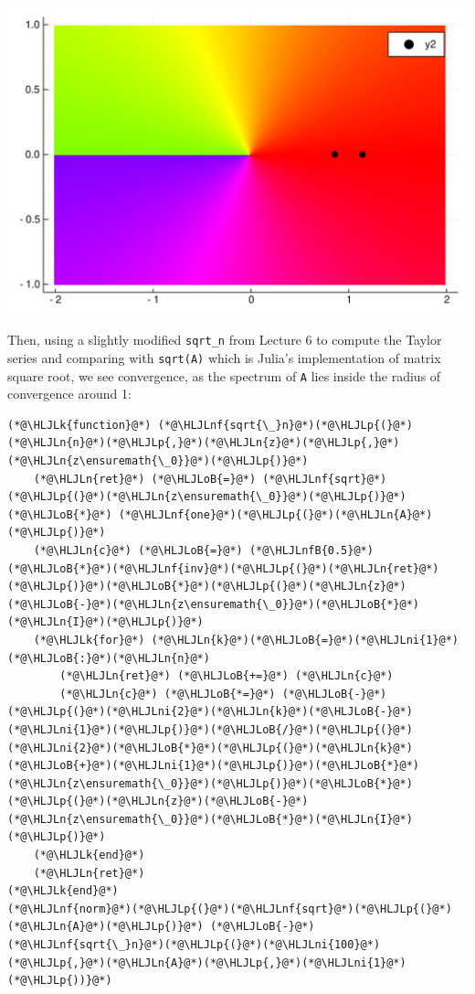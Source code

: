 \documentclass[12pt,a4paper]{article}
\newcommand{\HLJLk}[1]{\textcolor[RGB]{148,91,176}{\textbf{#1}}}
\newcommand{\HLJLn}[1]{#1}
\newcommand{\HLJLnf}[1]{\textcolor[RGB]{66,102,213}{#1}}
\newcommand{\HLJLnfB}[1]{\textcolor[RGB]{59,151,46}{#1}}
\newcommand{\HLJLni}[1]{\textcolor[RGB]{59,151,46}{#1}}
\newcommand{\HLJLoB}[1]{\textcolor[RGB]{102,102,102}{\textbf{#1}}}
\newcommand{\HLJLp}[1]{#1}
\begin{document}
\includegraphics[width=\linewidth]{figures/Lecture7_1_1.pdf}

Then, using a slightly modified \texttt{sqrt\_n} from Lecture 6 to compute the Taylor series and  comparing with \texttt{sqrt(A)} which is Julia's implementation of matrix square root, we see convergence, as the spectrum of \texttt{A} lies inside the radius of convergence around 1:


\begin{lstlisting}
(*@\HLJLk{function}@*) (*@\HLJLnf{sqrt{\_}n}@*)(*@\HLJLp{(}@*)(*@\HLJLn{n}@*)(*@\HLJLp{,}@*)(*@\HLJLn{z}@*)(*@\HLJLp{,}@*)(*@\HLJLn{z\ensuremath{\_0}}@*)(*@\HLJLp{)}@*) 
    (*@\HLJLn{ret}@*) (*@\HLJLoB{=}@*) (*@\HLJLnf{sqrt}@*)(*@\HLJLp{(}@*)(*@\HLJLn{z\ensuremath{\_0}}@*)(*@\HLJLp{)}@*) (*@\HLJLoB{*}@*) (*@\HLJLnf{one}@*)(*@\HLJLp{(}@*)(*@\HLJLn{A}@*)(*@\HLJLp{)}@*)
    (*@\HLJLn{c}@*) (*@\HLJLoB{=}@*) (*@\HLJLnfB{0.5}@*)(*@\HLJLoB{*}@*)(*@\HLJLnf{inv}@*)(*@\HLJLp{(}@*)(*@\HLJLn{ret}@*)(*@\HLJLp{)}@*)(*@\HLJLoB{*}@*)(*@\HLJLp{(}@*)(*@\HLJLn{z}@*)(*@\HLJLoB{-}@*)(*@\HLJLn{z\ensuremath{\_0}}@*)(*@\HLJLoB{*}@*)(*@\HLJLn{I}@*)(*@\HLJLp{)}@*)
    (*@\HLJLk{for}@*) (*@\HLJLn{k}@*)(*@\HLJLoB{=}@*)(*@\HLJLni{1}@*)(*@\HLJLoB{:}@*)(*@\HLJLn{n}@*)
        (*@\HLJLn{ret}@*) (*@\HLJLoB{+=}@*) (*@\HLJLn{c}@*)
        (*@\HLJLn{c}@*) (*@\HLJLoB{*=}@*) (*@\HLJLoB{-}@*)(*@\HLJLp{(}@*)(*@\HLJLni{2}@*)(*@\HLJLn{k}@*)(*@\HLJLoB{-}@*)(*@\HLJLni{1}@*)(*@\HLJLp{)}@*)(*@\HLJLoB{/}@*)(*@\HLJLp{(}@*)(*@\HLJLni{2}@*)(*@\HLJLoB{*}@*)(*@\HLJLp{(}@*)(*@\HLJLn{k}@*)(*@\HLJLoB{+}@*)(*@\HLJLni{1}@*)(*@\HLJLp{)}@*)(*@\HLJLoB{*}@*)(*@\HLJLn{z\ensuremath{\_0}}@*)(*@\HLJLp{)}@*)(*@\HLJLoB{*}@*)(*@\HLJLp{(}@*)(*@\HLJLn{z}@*)(*@\HLJLoB{-}@*)(*@\HLJLn{z\ensuremath{\_0}}@*)(*@\HLJLoB{*}@*)(*@\HLJLn{I}@*)(*@\HLJLp{)}@*)
    (*@\HLJLk{end}@*)
    (*@\HLJLn{ret}@*)
(*@\HLJLk{end}@*)
(*@\HLJLnf{norm}@*)(*@\HLJLp{(}@*)(*@\HLJLnf{sqrt}@*)(*@\HLJLp{(}@*)(*@\HLJLn{A}@*)(*@\HLJLp{)}@*) (*@\HLJLoB{-}@*) (*@\HLJLnf{sqrt{\_}n}@*)(*@\HLJLp{(}@*)(*@\HLJLni{100}@*)(*@\HLJLp{,}@*)(*@\HLJLn{A}@*)(*@\HLJLp{,}@*)(*@\HLJLni{1}@*)(*@\HLJLp{))}@*)
\end{lstlisting}
\end{document}
